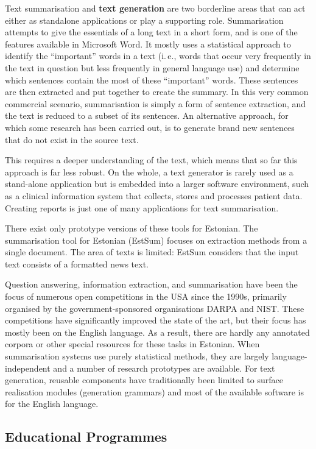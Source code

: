 \begin{multicols}{2}
Text summarisation and \textbf{text generation} are two borderline areas that can act either as standalone applications or play a supporting role. Summarisation attempts to give the essentials of a long text in a short form, and is one of the features available in Microsoft Word. It mostly uses a statistical approach to identify the ``important'' words in a text (i.\,e., words that occur very frequently in the text in question but less frequently in general language use) and determine which sentences contain the most of these ``important'' words. These sentences are then extracted and put together to create the summary. In this very common commercial scenario, summarisation is simply a form of sentence extraction, and the text is reduced to a subset of its sentences. An alternative approach, for which some research has been carried out, is to generate brand new sentences that do not exist in the source text.

This requires a deeper understanding of the text, which means that so far this approach is far less robust. On the whole, a text generator is rarely used as a stand-alone application but is embedded into a larger software environment, such as a clinical information system that collects, stores and processes patient data. Creating reports is just one of many applications for text summarisation.

There exist only prototype versions of these tools for Estonian.  The summarisation tool for Estonian (EstSum) focuses on extraction methods from a single document.  The area of texts is limited: EstSum considers that the input text consists of a formatted news text.

Question answering, information extraction, and summarisation have been the focus of numerous open competitions in the USA since the 1990s, primarily organised by the government-sponsored organisations DARPA and NIST. These competitions have significantly improved the state of the art, but their focus has mostly been on the English language. As a result, there are hardly any annotated corpora or other special resources for these tasks in Estonian. When summarisation systems use purely statistical methods, they are largely language-independent and a number of research prototypes are available. For text generation, reusable components have traditionally been limited to surface realisation modules (generation grammars) and most of the available software is for the English language.

\subsection{Educational Programmes}


\end{multicols}
